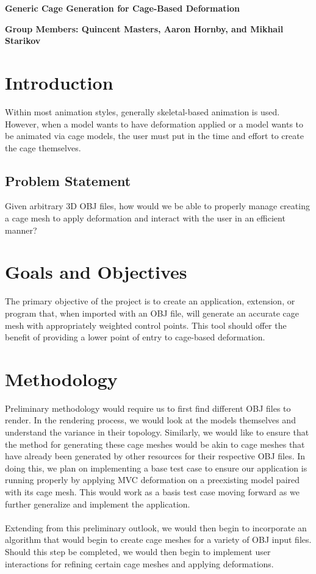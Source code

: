 \documentclass[11pt]{article}
\begin{document}
 \begin{center}

{\large\bf Generic Cage Generation for Cage-Based Deformation}
\end{center}
\textbf{Group Members: Quincent Masters, Aaron Hornby, and Mikhail Starikov}

\section{Introduction}
Within most animation styles, generally skeletal-based animation is used. However, when a model wants to have deformation applied or a model wants to be animated via cage models, the user must put in the time and effort to create the cage themselves. 
\subsection{Problem Statement}
Given arbitrary 3D OBJ files, how would we be able to properly manage creating a cage mesh to apply deformation and interact with the user in an efficient manner?
\section{Goals and Objectives}
The primary objective of the project is to create an application, extension, or program that, when imported with an OBJ file, will generate an accurate cage mesh with appropriately weighted control points. This tool should offer the benefit of providing a lower point of entry to cage-based deformation. 
\section{Methodology}
Preliminary methodology would require us to first find different OBJ files to render. In the rendering process, we would look at the models themselves and understand the variance in their topology. Similarly, we would like to ensure that the method for generating these cage meshes would be akin to cage meshes that have already been generated by other resources for their respective OBJ files. In doing this, we plan on implementing a base test case to ensure our application is running properly by applying MVC deformation on a preexisting model paired with its cage mesh. This would work as a basis test case moving forward as we further generalize and implement the application.\\
\\ 
Extending from this preliminary outlook, we would then begin to incorporate an algorithm that would begin to create cage meshes for a variety of OBJ input files. Should this step be completed, we would then begin to implement user interactions for refining certain cage meshes and applying deformations.
\end{document}
